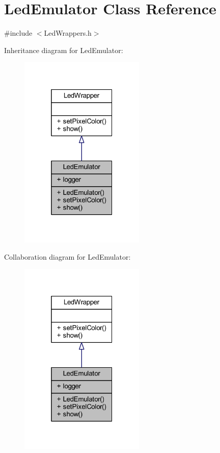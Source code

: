 \hypertarget{class_led_emulator}{}\section{Led\+Emulator Class Reference}
\label{class_led_emulator}


{\ttfamily \#include $<$Led\+Wrappers.\+h$>$}



Inheritance diagram for Led\+Emulator\+:
\nopagebreak
\begin{figure}[H]
\begin{center}
\leavevmode
\includegraphics[width=169pt]{class_led_emulator__inherit__graph}
\end{center}
\end{figure}


Collaboration diagram for Led\+Emulator\+:
\nopagebreak
\begin{figure}[H]
\begin{center}
\leavevmode
\includegraphics[width=169pt]{class_led_emulator__coll__graph}
\end{center}
\end{figure}
